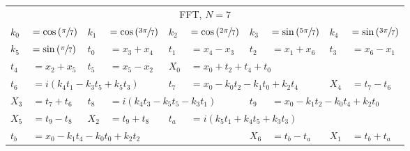 \begin{tabular}{|p{4.3pt}l|p{4.3pt}l|p{4.3pt}l|p{4.3pt}l|p{4.3pt}l|}\toprule \multicolumn{10}{|c|}{FFT, $N=7$} \\
$k_0 $ &$= \cos\left(\sfrac{\pi}{7}\right)$ & $k_1 $ &$= \cos\left(\sfrac{3\pi}{7}\right)$ & $k_2 $ &$= \cos\left(\sfrac{2\pi}{7}\right)$ & $k_3 $ &$= \sin\left(\sfrac{5\pi}{7}\right)$ & $k_4 $ &$= \sin\left(\sfrac{3\pi}{7}\right)$\\ 
$k_5 $ &$= \sin\left(\sfrac{\pi}{7}\right)$ & $t_0 $ &$= x_3 + x_4$ & $t_1 $ &$= x_4 - x_3$ & $t_2 $ &$= x_1 + x_6$ & $t_3 $ &$= x_6 - x_1$\\ 
$t_4 $ &$= x_2 + x_5$ & $t_5 $ &$= x_5 - x_2$ & $X_0 $ &\multicolumn{5}{l|}{$= x_0 + t_2 + t_4 + t_0$}\\ 
$t_6 $ &\multicolumn{3}{l|}{$= i(k_4t_1 - k_3t_5 + k_5t_3)$} & $t_7 $ &\multicolumn{3}{l|}{$= x_0 - k_0t_2 - k_1t_0 + k_2t_4$} & $X_4 $ &$= t_7 - t_6$\\ 
$X_3 $ &$= t_7 + t_6$ & $t_8 $ &\multicolumn{3}{l|}{$= i(k_4t_3 - k_5t_5 - k_3t_1)$} & $t_9 $ &\multicolumn{3}{l|}{$= x_0 - k_1t_2 - k_0t_4 + k_2t_0$}\\ 
$X_5 $ &$= t_9 - t_8$ & $X_2 $ &$= t_9 + t_8$ & $t_a $ &\multicolumn{5}{l|}{$= i(k_5t_1 + k_4t_5 + k_3t_3)$}\\ 
$t_b $ &\multicolumn{5}{l|}{$= x_0 - k_1t_4 - k_0t_0 + k_2t_2$} & $X_6 $ &$= t_b - t_a$ & $X_1 $ &$= t_b + t_a$\\ 
\bottomrule\end{tabular}
